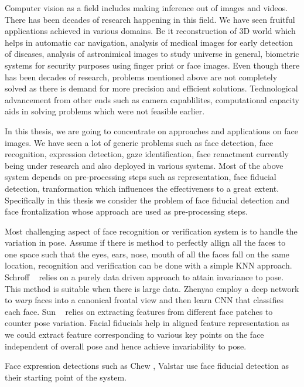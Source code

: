 Computer vision as a field includes making inference out of images and videos. There has been decades of research 
happening in this field. We have seen fruitful applications achieved in various domains. Be it 
reconstruction of 3D world which helps in automatic car navigation, analysis of medical images for 
early detection of diseases, analysis of astronimical images to study universe in general, biometric
systems for security purposes using finger print or face images. Even though there has been decades of 
research, problems mentioned above are not completely solved as there is demand for more precision
and efficient solutions. Technological advancement from other ends such as camera capablilites,
computational capacity aids in solving problems which were not feasible earlier.

In this thesis, we are going to concentrate on approaches and applications on face images. We have seen
a lot of generic problems such as face detection, face recognition, expression detection, gaze
identification, face renactment \etc  currently being under research and also deployed in various 
systems. Most of the above system depends on pre-processing steps such as representation, face fiducial 
detection, tranformation \etc which influences the effectiveness to a great extent. Specifically in this
thesis we consider the problem of face fiducial detection and face frontalization whose approach are 
used as pre-processing steps.

Most challenging aspect of face recognition or verification system is to handle the variation in 
pose. Assume if there is method to perfectly allign all the faces to one space such that the eyes,
ears, nose, mouth \etc of all the faces fall on the same location, recognition and verification
can be done with a simple KNN approach. Schroff \etal ~\cite{conf/cvpr/SchroffKP15} relies on a purely data driven 
approach to attain invariance to pose. This method is suitable when there is large data. 
Zhenyao \etal \cite{DBLP:journals/corr/ZhuLWT14} employ a deep network to \textit{warp} faces into a canonical 
frontal view and then learn CNN that classifies each face. Sun \etal~\cite{NIPS2014_5416} relies on 
extracting features from different face patches to counter pose variation. Facial fiducials help in
aligned feature representation as we could extract feature corresponding to various key points on 
the face independent of overall pose and hence achieve invariability to pose. 

Face expression detections such as Chew \etal \cite{conf/fgr/ChewLLSCS11}, Valstar \etal \cite{Valstar:2006:FAF:1153172.1153856} 
use face fiducial detection as their starting point of the system. 

